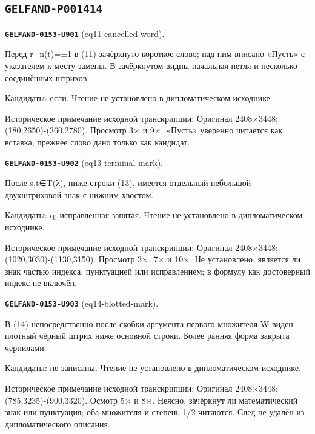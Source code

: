 \subsection*{\texttt{GELFAND-P001414}}
\par\noindent\leavevmode{}\label{GELFAND-0153-U901}\textbf{\texttt{GELFAND-0153-U901}} (eq11-cancelled-word).\nopagebreak[4]\par
Перед r\_n(t)=±1 в (11) зачёркнуто короткое слово; над ним вписано «Пусть» с указателем к месту замены. В зачёркнутом видны начальная петля и несколько соединённых штрихов.\par
Кандидаты: если. Чтение не установлено в дипломатическом исходнике.\par
Историческое примечание исходной транскрипции: Оригинал 2408×3448; (180,2650)-(360,2780). Просмотр 3× и 9×. «Пусть» уверенно читается как вставка; прежнее слово дано только как кандидат.\par\medskip
\par\noindent\leavevmode{}\label{GELFAND-0153-U902}\textbf{\texttt{GELFAND-0153-U902}} (eq13-terminal-mark).\nopagebreak[4]\par
После s,t∈T(λ), ниже строки (13), имеется отдельный небольшой двухштриховой знак с нижним хвостом.\par
Кандидаты: q; исправленная запятая. Чтение не установлено в дипломатическом исходнике.\par
Историческое примечание исходной транскрипции: Оригинал 2408×3448; (1020,3030)-(1130,3150). Просмотр 3×, 7× и 10×. Не установлено, является ли знак частью индекса, пунктуацией или исправлением; в формулу как достоверный индекс не включён.\par\medskip
\par\noindent\leavevmode{}\label{GELFAND-0153-U903}\textbf{\texttt{GELFAND-0153-U903}} (eq14-blotted-mark).\nopagebreak[4]\par
В (14) непосредственно после скобки аргумента первого множителя W виден плотный чёрный штрих ниже основной строки. Более ранняя форма закрыта чернилами.\par
Кандидаты: не записаны. Чтение не установлено в дипломатическом исходнике.\par
Историческое примечание исходной транскрипции: Оригинал 2408×3448; (785,3235)-(900,3320). Осмотр 5× и 8×. Неясно, зачёркнут ли математический знак или пунктуация; оба множителя и степень 1/2 читаются. След не удалён из дипломатического описания.\par\medskip
